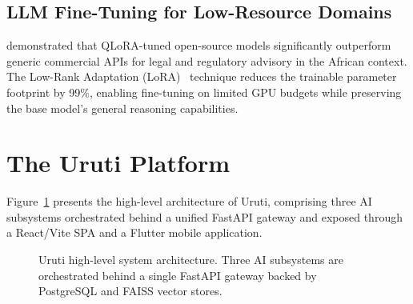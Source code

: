 \documentclass{article}
\begin{document}
\FloatBarrier
\subsection{LLM Fine-Tuning for Low-Resource Domains}

\citet{murekatete2026} demonstrated that QLoRA-tuned
open-source models significantly outperform generic commercial APIs for legal
and regulatory advisory in the African context. The Low-Rank Adaptation
(LoRA)~\citep{hu2022lora} technique reduces the trainable parameter
footprint by 99\%, enabling fine-tuning on limited GPU budgets while preserving
the base model's general reasoning capabilities.


\FloatBarrier
\section{The Uruti Platform}

Figure~\ref{fig:architecture} presents the high-level architecture of Uruti,
comprising three AI subsystems orchestrated behind a unified FastAPI gateway
and exposed through a React/Vite SPA and a Flutter mobile application.

\begin{figure}[htbp]
\centering
{}
\caption{Uruti high-level system architecture. Three AI subsystems are
         orchestrated behind a single FastAPI gateway backed by PostgreSQL
         and FAISS vector stores.}
\label{fig:architecture}
\end{figure}
\end{document}
